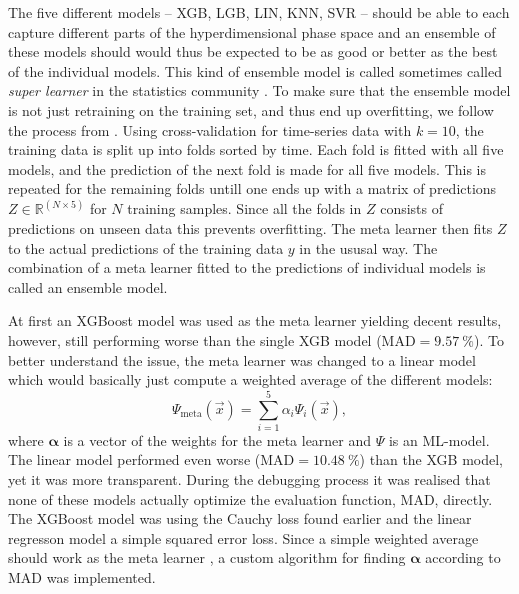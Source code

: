 The five different models -- XGB, LGB, LIN, KNN, SVR -- should be able to each capture different parts of the hyperdimensional phase space and an ensemble of these models should would thus be expected to be as good or better as the best of the individual models. This kind of ensemble model is called sometimes called \emph{super learner} in the statistics community \autocite{polleySuperLearnerPrediction2010,vanSuperLearner2007}. To make sure that the ensemble model is not just retraining on the training set, and thus end up overfitting, we follow the process from \citet{polleySuperLearnerPrediction2010}. Using cross-validation for time-series data with $k=10$, the training data is split up into folds sorted by time. Each fold is fitted with all five models, and the prediction of the next fold is made for all five models. This is repeated for the remaining folds untill one ends up with a matrix of predictions $Z \in \mathbb{R}^{(N \times 5)}$ for $N$ training samples. Since all the folds in $Z$ consists of predictions on unseen data this prevents overfitting. The meta learner then fits $Z$ to the actual predictions of the training data $y$ in the ususal way. The combination of a meta learner fitted to the predictions of individual models is called an ensemble model.

At first an XGBoost model was used as the meta learner yielding decent results, however, still performing worse than the single XGB model ($\mathrm{MAD} = \SI{9.57}{\percent}$). To better understand the issue, the meta learner was changed to a linear model which would basically just compute a weighted average of the different models:
\begin{equation}
  \label{eq:h:meta_learner}
  \Psi_\mathrm{meta}(\vec{x}) = \sum_{i=1}^5 \alpha_i \Psi_i(\vec{x}),
\end{equation}
where $\bm{\alpha}$ is a vector of the weights for the meta learner and $\Psi$ is an ML-model. The linear model performed even worse ($\mathrm{MAD} = \SI{10.48}{\percent}$) than the XGB model, yet it was more transparent. During the debugging process it was realised that none of these models actually optimize the evaluation function, MAD, directly. The XGBoost model was using the Cauchy loss found earlier and the linear regresson model a simple squared error loss. Since a simple weighted average should work as the meta learner \citep{polleySuperLearnerPrediction2010}, a custom algorithm for finding $\bm{\alpha}$ according to MAD was implemented.


